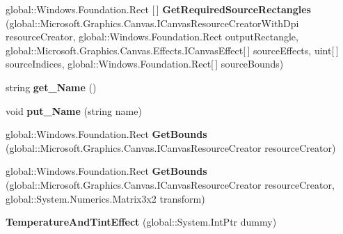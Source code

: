 \begin{DoxyCompactItemize}
global\+::\+Windows.\+Foundation.\+Rect \mbox{[}$\,$\mbox{]} {\bfseries Get\+Required\+Source\+Rectangles} (global\+::\+Microsoft.\+Graphics.\+Canvas.\+I\+Canvas\+Resource\+Creator\+With\+Dpi resource\+Creator, global\+::\+Windows.\+Foundation.\+Rect output\+Rectangle, global\+::\+Microsoft.\+Graphics.\+Canvas.\+Effects.\+I\+Canvas\+Effect\mbox{[}$\,$\mbox{]} source\+Effects, uint\mbox{[}$\,$\mbox{]} source\+Indices, global\+::\+Windows.\+Foundation.\+Rect\mbox{[}$\,$\mbox{]} source\+Bounds)
\item 
\mbox{\label{class_microsoft_1_1_graphics_1_1_canvas_1_1_effects_1_1_temperature_and_tint_effect_a4df8404f8f5aef6c4eb31020b10b7077}} 
string {\bfseries get\+\_\+\+Name} ()
\item 
\mbox{\label{class_microsoft_1_1_graphics_1_1_canvas_1_1_effects_1_1_temperature_and_tint_effect_adf0a816c81fcc171f9c60bc3f27288aa}} 
void {\bfseries put\+\_\+\+Name} (string name)
\item 
\mbox{\label{class_microsoft_1_1_graphics_1_1_canvas_1_1_effects_1_1_temperature_and_tint_effect_a110ff3583fb45b80ced1adb8beb3b37e}} 
global\+::\+Windows.\+Foundation.\+Rect {\bfseries Get\+Bounds} (global\+::\+Microsoft.\+Graphics.\+Canvas.\+I\+Canvas\+Resource\+Creator resource\+Creator)
\item 
\mbox{\label{class_microsoft_1_1_graphics_1_1_canvas_1_1_effects_1_1_temperature_and_tint_effect_aa1c4ce395cadd2b55228ea1a45617bb1}} 
global\+::\+Windows.\+Foundation.\+Rect {\bfseries Get\+Bounds} (global\+::\+Microsoft.\+Graphics.\+Canvas.\+I\+Canvas\+Resource\+Creator resource\+Creator, global\+::\+System.\+Numerics.\+Matrix3x2 transform)
\item 
\mbox{\label{class_microsoft_1_1_graphics_1_1_canvas_1_1_effects_1_1_temperature_and_tint_effect_a81f3532465d1de1b98e13a50b2571a0f}} 
{\bfseries Temperature\+And\+Tint\+Effect} (global\+::\+System.\+Int\+Ptr dummy)
\item 

\end{DoxyCompactItemize}
